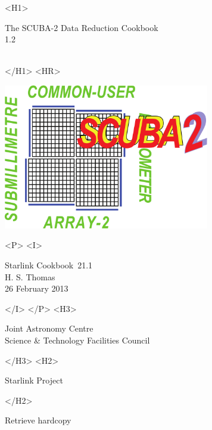 \documentclass[twoside,11pt]{article}
\newcommand{\stardoccategory} {Starlink Cookbook}
\newcommand{\stardocsource} {sc\stardocnumber}
\newcommand{\stardocnumber} {21.1}
\newcommand{\stardocauthors} {H. S. Thomas}
\newcommand{\stardocdate} {26 February 2013}
\newcommand{\stardoctitle} {The SCUBA-2 Data Reduction Cookbook}
\newcommand{\stardocversion} {1.2}
\newcommand{\stardocmanual} {\ }
\newcommand{\htmladdnormallink}[2]{#1}
\newcommand{\htmladdimg}[1]{}
\newcommand{\xlabel}[1]{}
\renewcommand{\_}{\texttt{\symbol{95}}}
\begin{document}
\begin{htmlonly}
   \xlabel{}
   \begin{rawhtml} <H1> \end{rawhtml}
      \stardoctitle\\
      \stardocversion\\
      \stardocmanual
   \begin{rawhtml} </H1> <HR> \end{rawhtml}

   \includegraphics[width=90mm]{sc21_s2logo}

   \begin{rawhtml} <P> <I> \end{rawhtml}
   \stardoccategory\ \stardocnumber \\
   \stardocauthors \\
   \stardocdate
   \begin{rawhtml} </I> </P> <H3> \end{rawhtml}
      \htmladdnormallink{Joint Astronomy Centre}
                        {http://www.jach.hawaii.edu}\\
      \htmladdnormallink{Science \& Technology Facilities Council}
                        {http://www.scitech.ac.uk} \\
   \begin{rawhtml} </H3> <H2> \end{rawhtml}
      \htmladdnormallink{Starlink Project}{http://www.starlink.ac.uk/}
   \begin{rawhtml} </H2> \end{rawhtml}
   \htmladdnormallink{\htmladdimg{source.gif} Retrieve hardcopy}
      {http://www.starlink.ac.uk/cgi-bin/hcserver?\stardocsource}\\


\end{htmlonly}
\end{document}
